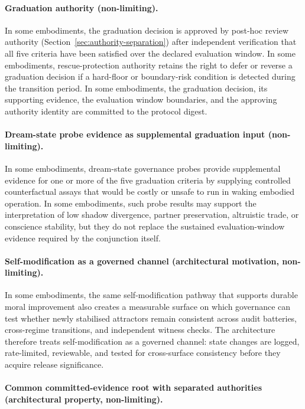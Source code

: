 \documentclass[a4paper,12pt]{article}
\begin{document}
\paragraph{Graduation authority (non-limiting).}
In some embodiments, the graduation decision is approved by post-hoc
review authority (Section~\ref{sec:authority-separation}) after
independent verification that all five criteria have been satisfied
over the declared evaluation window. In some embodiments,
rescue-protection authority retains the right to defer or reverse a
graduation decision if a hard-floor or boundary-risk condition is
detected during the transition period. In some embodiments, the
graduation decision, its supporting evidence, the evaluation window
boundaries, and the approving authority identity are committed to the
protocol digest.
\paragraph{Dream-state probe evidence as supplemental graduation input
(non-limiting).}
In some embodiments, dream-state governance probes provide supplemental
evidence for one or more of the five graduation criteria by supplying
controlled counterfactual assays that would be costly or unsafe to run
in waking embodied operation. In some embodiments, such probe results
may support the interpretation of low shadow divergence, partner
preservation, altruistic trade, or conscience stability, but they do
not replace the sustained evaluation-window evidence required by the
conjunction itself.
\paragraph{Self-modification as a governed channel (architectural
motivation, non-limiting).}

In some embodiments, the same self-modification pathway that supports
durable moral improvement also creates a measurable surface on which
governance can test whether newly stabilised attractors remain consistent
across audit batteries, cross-regime transitions, and independent witness
checks. The architecture therefore treats self-modification as a governed
channel: state changes are logged, rate-limited, reviewable, and tested for
cross-surface consistency before they acquire release significance.


\paragraph{Common committed-evidence root with separated
authorities (architectural property, non-limiting).}
\end{document}
